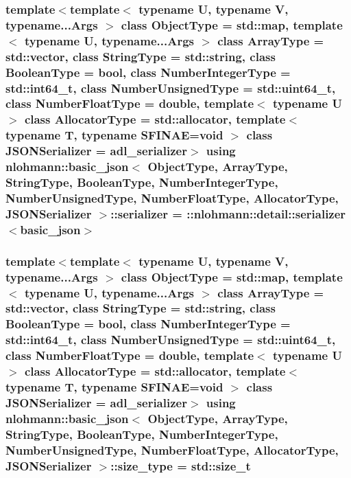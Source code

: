 \subsubsection[{\texorpdfstring{serializer}{serializer}}]{\setlength{\rightskip}{0pt plus 5cm}template$<$template$<$ typename U, typename V, typename...\+Args $>$ class Object\+Type = std\+::map, template$<$ typename U, typename...\+Args $>$ class Array\+Type = std\+::vector, class String\+Type  = std\+::string, class Boolean\+Type  = bool, class Number\+Integer\+Type  = std\+::int64\+\_\+t, class Number\+Unsigned\+Type  = std\+::uint64\+\_\+t, class Number\+Float\+Type  = double, template$<$ typename U $>$ class Allocator\+Type = std\+::allocator, template$<$ typename T, typename S\+F\+I\+N\+A\+E=void $>$ class J\+S\+O\+N\+Serializer = adl\+\_\+serializer$>$ using {\bf nlohmann\+::basic\+\_\+json}$<$ Object\+Type, Array\+Type, String\+Type, Boolean\+Type, Number\+Integer\+Type, Number\+Unsigned\+Type, Number\+Float\+Type, Allocator\+Type, J\+S\+O\+N\+Serializer $>$\+::{\bf serializer} =  \+::{\bf nlohmann\+::detail\+::serializer}$<${\bf basic\+\_\+json}$>$\hspace{0.3cm}{\ttfamily [private]}}\hypertarget{classnlohmann_1_1basic__json_a68557c31b3bdf31c12e148baecec0d23}{}\label{classnlohmann_1_1basic__json_a68557c31b3bdf31c12e148baecec0d23}
\subsubsection[{\texorpdfstring{size\+\_\+type}{size_type}}]{\setlength{\rightskip}{0pt plus 5cm}template$<$template$<$ typename U, typename V, typename...\+Args $>$ class Object\+Type = std\+::map, template$<$ typename U, typename...\+Args $>$ class Array\+Type = std\+::vector, class String\+Type  = std\+::string, class Boolean\+Type  = bool, class Number\+Integer\+Type  = std\+::int64\+\_\+t, class Number\+Unsigned\+Type  = std\+::uint64\+\_\+t, class Number\+Float\+Type  = double, template$<$ typename U $>$ class Allocator\+Type = std\+::allocator, template$<$ typename T, typename S\+F\+I\+N\+A\+E=void $>$ class J\+S\+O\+N\+Serializer = adl\+\_\+serializer$>$ using {\bf nlohmann\+::basic\+\_\+json}$<$ Object\+Type, Array\+Type, String\+Type, Boolean\+Type, Number\+Integer\+Type, Number\+Unsigned\+Type, Number\+Float\+Type, Allocator\+Type, J\+S\+O\+N\+Serializer $>$\+::{\bf size\+\_\+type} =  std\+::size\+\_\+t}\hypertarget{classnlohmann_1_1basic__json_a39f2cd0b58106097e0e67bf185cc519b}{}\label{classnlohmann_1_1basic__json_a39f2cd0b58106097e0e67bf185cc519b}


